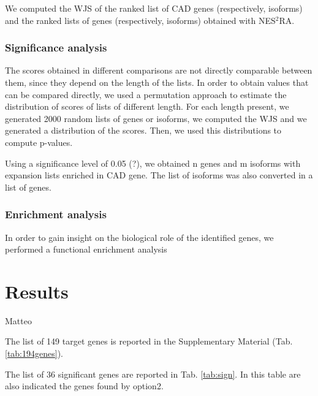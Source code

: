 \documentclass[fleqn,10pt]{SelfArx} %
\begin{document}
We computed the WJS of the ranked list of CAD genes (respectively, isoforms) and the ranked lists of genes (respectively, isoforms) obtained with NES$^2$RA.

\subsubsection{Significance analysis} 

The scores obtained in different comparisons are not directly comparable between them, since they depend on the length of the lists. In order to obtain values that can be compared directly, we used a permutation approach to estimate the distribution of scores of lists of different length. For each length present, we generated 2000 random lists of genes or isoforms, we computed the WJS and we generated a distribution of the scores. Then, we used this distributions to compute p-values.

Using a significance level of 0.05 (?), we obtained n genes and m isoforms with expansion lists enriched in CAD gene. The list of isoforms was also converted in a list of genes.

\subsubsection{Enrichment analysis}

In order to gain insight on the biological role of the identified genes, we performed a functional enrichment analysis 


\section*{Results}
Matteo

The list of 149 target genes is reported in the Supplementary Material (Tab. \ref{tab:194genes}).

The list of 36 significant genes are reported in Tab. \ref{tab:sign}. In this table are also indicated the genes found by option2.

\renewcommand{\arraystretch}{1.1}
\end{document}
